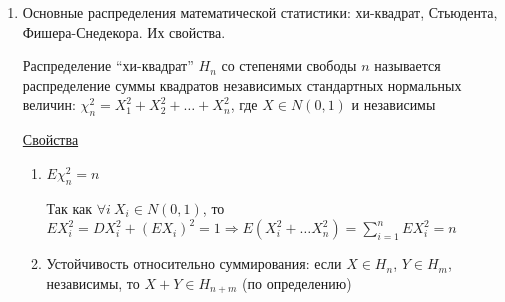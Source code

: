 \documentclass[12pt]{article}
\begin{document}
\begin{enumerate}
    \Def Семейство распределений $F_\theta$ называется регулярным, если:

    \begin{itemize}
        \item существует носитель $C$ семейства $F_\theta$ такой, что $\forall x \in C \ $ функция $\ln f_\theta(x)$ непрерывно дифференцируема по $\theta$
        \item информация Фишера $I(\theta)$ существует и непрерывна по $\theta$
    \end{itemize}

    \begin{MyTheorem}
         Пусть $(X_1, \dots, X_n)$ - выборка объема $n$ из регулярного семейства $F_\theta$,

        $\theta^* = \theta^*(X_1, \dots, X_n)$ - несмещенная оценка параметра $\theta$, дисперсия которой
        $D\theta^*$ ограничена в любой замкнутой ограниченной области параметра $\theta$

        Тогда 
    \end{MyTheorem}

    \underline{Следствие}: если при данных услових получили $D\theta^* = \frac{1}{n I(\theta)}$, то оценка $\theta^*$ является эффективной 
    (то есть дальше улучшать уже некуда)

    \item Основные распределения математической статистики: хи-квадрат, Стьюдента, Фишера-Снедекора. Их свойства.

    \Def Распределение \enquote{хи-квадрат} $H_n$ со степенями свободы $n$ называется распределение
    суммы квадратов независимых стандартных нормальных величин: $\chi^2_n = X_1^2 + X_2^2 + \dots + X_n^2$, 
    где $X \in N(0, 1)$ и независимы

    \underline{Свойства}

    \begin{enumerate}
        \item $E\chi^2_n = n$

        \begin{MyProof}
            Так как $\forall i \ X_i \in N(0, 1)$, то $E X_i^2 = D X_i^2 + (EX_i)^2 = 1 \Longrightarrow E(X_i^2 + \dots X_n^2) = \sum_{i = 1}^n E X_i^2 = n$
        \end{MyProof}

        \item Устойчивость относительно суммирования: если $X \in H_n$, $Y \in H_m$, независимы, то $X + Y \in H_{n + m}$ (по определению) 



\end{enumerate}
\end{enumerate}
\end{document}
